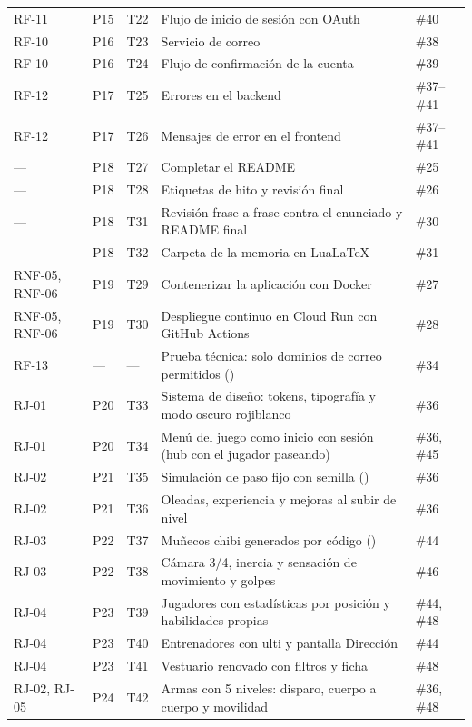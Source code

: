 {\begin{longtable}{@{}L{1.5cm} L{0.8cm} L{1.3cm} L{7.0cm} L{2.9cm}@{}}
RF-11 & P15 & T22 & Flujo de inicio de sesión con OAuth & \#40 \\
RF-10 & P16 & T23 & Servicio de correo & \#38 \\
RF-10 & P16 & T24 & Flujo de confirmación de la cuenta & \#39 \\
RF-12 & P17 & T25 & Errores en el backend & \#37--\#41 \\
RF-12 & P17 & T26 & Mensajes de error en el frontend & \#37--\#41 \\
— & P18 & T27 & Completar el README & \#25 \\
— & P18 & T28 & Etiquetas de hito y revisión final & \#26 \\
— & P18 & T31 & Revisión frase a frase contra el enunciado y README final & \#30 \\
— & P18 & T32 & Carpeta de la memoria en LuaLaTeX & \#31 \\
RNF-05, RNF-06 & P19 & T29 & Contenerizar la aplicación con Docker & \#27 \\
RNF-05, RNF-06 & P19 & T30 & Despliegue continuo en Cloud Run con GitHub Actions & \#28 \\
RF-13 & — & — & Prueba técnica: solo dominios de correo permitidos () & \#34 \\
RJ-01 & P20 & T33 & Sistema de diseño: tokens, tipografía y modo oscuro rojiblanco & \#36 \\
RJ-01 & P20 & T34 & Menú del juego como inicio con sesión (hub con el jugador paseando) & \#36, \#45 \\
RJ-02 & P21 & T35 & Simulación de paso fijo con semilla () & \#36 \\
RJ-02 & P21 & T36 & Oleadas, experiencia y mejoras al subir de nivel & \#36 \\
RJ-03 & P22 & T37 & Muñecos chibi generados por código () & \#44 \\
RJ-03 & P22 & T38 & Cámara 3/4, inercia y sensación de movimiento y golpes & \#46 \\
RJ-04 & P23 & T39 & Jugadores con estadísticas por posición y habilidades propias & \#44, \#48 \\
RJ-04 & P23 & T40 & Entrenadores con ulti y pantalla Dirección & \#44 \\
RJ-04 & P23 & T41 & Vestuario renovado con filtros y ficha & \#48 \\
RJ-02, RJ-05 & P24 & T42 & Armas con 5 niveles: disparo, cuerpo a cuerpo y movilidad & \#36, \#48 \\

\end{longtable}}

